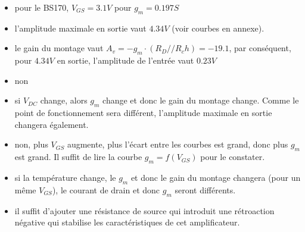 \documentclass{../template/tp}
\newcommand{\itgv}[1]{\ifthenelse{\boolean{corrige}}{{\color{blue}#1}}{}} %
\begin{document}
{
\begin{itemize}
\item pour le BS170, $V_{GS}=3.1V$ pour $g_m=0.197S$
\item l'amplitude maximale en sortie vaut $4.34V$ (voir courbes en annexe).
\item le gain du montage vaut $A_v=-g_m\cdot \left(R_D//R_ch\right)=-19.1$, par conséquent, pour $4.34V$ en sortie, l'amplitude de l'entrée vaut $0.23V$
\item non
\item si $V_{DC}$ change, alors $g_m$ change et donc le gain du montage change. Comme le point de fonctionnement sera différent, l'amplitude maximale en sortie changera également.
\item non, plus $V_{GS}$ augmente, plus l'écart entre les courbes est grand, donc plus $g_m$ est grand. Il suffit de lire la courbe $g_m=f(V_{GS})$ pour le constater.
\item si la température change, le $g_m$ et donc le gain du montage changera (pour un même $V_{GS}$), le courant de drain et donc $g_m$ seront différents.
\item il suffit d'ajouter une résistance de source qui introduit une rétroaction négative qui stabilise les caractéristiques de cet amplificateur. 
\end{itemize}
}

\itgv{\newpage}
\end{document}
